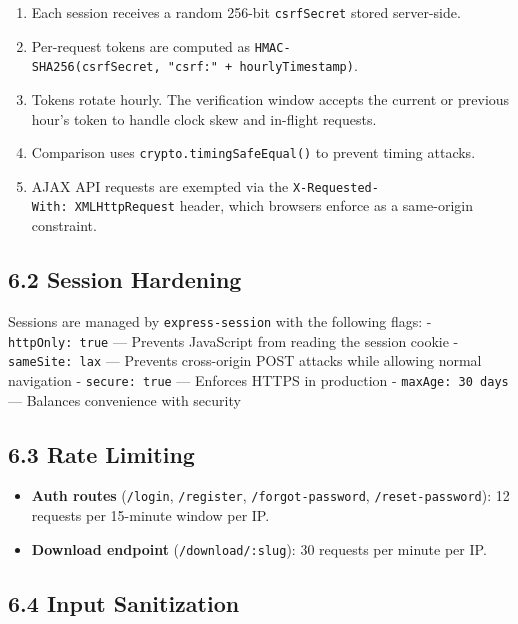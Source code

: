 \documentclass[
  11pt,
  oneside]{report}
\providecommand{\tightlist}{%
  \setlength{\itemsep}{0pt}\setlength{\parskip}{0pt}}
\begin{document}
\begin{enumerate}
\def\labelenumi{\arabic{enumi}.}
\tightlist
\item
  Each session receives a random 256-bit \texttt{csrfSecret} stored
  server-side.
\item
  Per-request tokens are computed as
  \texttt{HMAC-SHA256(csrfSecret,\ "csrf:"\ +\ hourlyTimestamp)}.
\item
  Tokens rotate hourly. The verification window accepts the current or
  previous hour's token to handle clock skew and in-flight requests.
\item
  Comparison uses \texttt{crypto.timingSafeEqual()} to prevent timing
  attacks.
\item
  AJAX API requests are exempted via the
  \texttt{X-Requested-With:\ XMLHttpRequest} header, which browsers
  enforce as a same-origin constraint.
\end{enumerate}

\subsection{6.2 Session Hardening}\label{session-hardening}

Sessions are managed by \texttt{express-session} with the following
flags: - \texttt{httpOnly:\ true} --- Prevents JavaScript from reading
the session cookie -
\texttt{sameSite:\ \textquotesingle{}lax\textquotesingle{}} --- Prevents
cross-origin POST attacks while allowing normal navigation -
\texttt{secure:\ true} --- Enforces HTTPS in production -
\texttt{maxAge:\ 30\ days} --- Balances convenience with security

\subsection{6.3 Rate Limiting}\label{rate-limiting}

\begin{itemize}
\tightlist
\item
  \textbf{Auth routes} (\texttt{/login}, \texttt{/register},
  \texttt{/forgot-password}, \texttt{/reset-password}): 12 requests per
  15-minute window per IP.
\item
  \textbf{Download endpoint} (\texttt{/download/:slug}): 30 requests per
  minute per IP.
\end{itemize}

\subsection{6.4 Input Sanitization}\label{input-sanitization}
\end{document}
